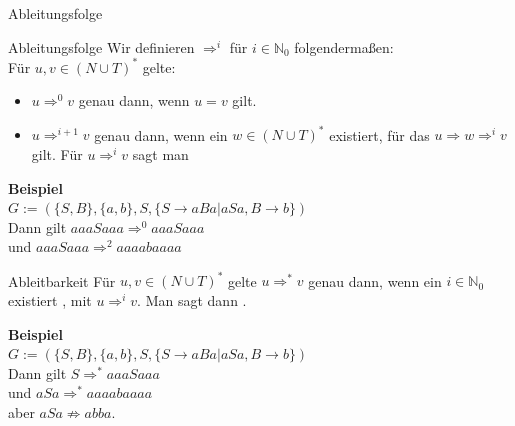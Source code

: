 \documentclass[handout]{beamer}
\begin{document}
\begin{frame}{Ableitungsfolge}
	\begin{block}{Ableitungsfolge}
	    Wir definieren $\Rightarrow^i$ für $i \in \mathbb{N}_0$ folgendermaßen:\\\vspace{.3cm}
		\bp Für $u,v \in (N \cup T)^*$ gelte:
		\begin{itemize}
			\item $u \Rightarrow^0 v$ genau dann, wenn $u = v$ gilt.
			\item $u \Rightarrow^{i+1} v$ genau dann, wenn ein $w \in (N \cup T)^* $ existiert, für das $u \Rightarrow w \Rightarrow^i v$ gilt.
			Für $u \Rightarrow^i v$ sagt man 
		\end{itemize}
	\end{block}

	\bp

	\textbf{Beispiel}\\
	$G:= (\{S,B\}, \{a,b\}, S, \{S \rightarrow aBa|aSa, B \rightarrow b\})$\\
	\ip Dann gilt $aaaSaaa \Rightarrow^0 aaaSaaa$ \ip \\
	und $aaaSaaa \Rightarrow^2 aaaabaaaa$
\end{frame}

\begin{frame}
	\begin{block}{Ableitbarkeit}
		Für $u,v \in (N \cup T)^*$ gelte $u \Rightarrow^* v$ genau dann, wenn ein $i \in \mathbb{N}_0$ existiert , mit $u \Rightarrow^i v$. Man sagt dann .
	\end{block}\bp
	\textbf{Beispiel}\\
	$G:= (\{S,B\}, \{a,b\}, S, \{S \rightarrow aBa|aSa, B \rightarrow b\})$\\
	\ip Dann gilt $S \Rightarrow^* aaaSaaa$ \ip \\
	und $aSa \Rightarrow^* aaaabaaaa$ \ip \\
	aber $aSa \not\Rightarrow abba$.
\end{frame}
\end{document}
